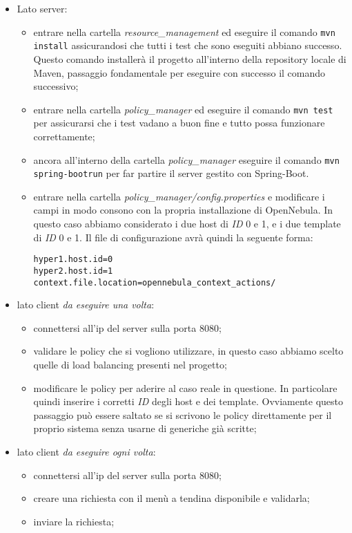 \begin{itemize}
    \item Lato server:
\begin{itemize}
    \item entrare nella cartella \emph{resource\_management} ed eseguire il comando \texttt{mvn install} assicurandosi che tutti i test che sono eseguiti abbiano successo. Questo comando installerà il progetto all'interno della repository locale di Maven, passaggio fondamentale per eseguire con successo il comando successivo;
    \item entrare nella cartella \emph{policy\_manager} ed eseguire il comando \texttt{mvn test} per assicurarsi che i test vadano a buon fine e tutto possa funzionare correttamente;
    \item ancora all'interno della cartella \emph{policy\_manager} eseguire il comando \texttt{mvn spring-boot\:run} per far partire il server gestito con Spring-Boot.
    \item entrare nella cartella \emph{policy\_manager/config.properties} e modificare i campi in modo consono con la propria installazione di OpenNebula. In questo caso abbiamo considerato i due host di \emph{ID} 0 e 1, e i due template di \emph{ID} 0 e 1. Il file di configurazione avrà quindi la seguente forma:
    \begin{lstlisting}[xleftmargin=1em, label={code:config_properties}, caption={config.properties}]
hyper1.host.id=0
hyper2.host.id=1
context.file.location=opennebula_context_actions/
    \end{lstlisting}
\end{itemize}
    \item lato client \emph{da eseguire una volta}:
    \begin{itemize}
        \item connettersi all'ip del server sulla porta 8080;
        \item validare le policy che si vogliono utilizzare, in questo caso abbiamo scelto quelle di load balancing presenti nel progetto;
        \item modificare le policy per aderire al caso reale in questione. In particolare quindi inserire i corretti \emph{ID} degli host e dei template. Ovviamente questo passaggio può essere saltato se si scrivono le policy direttamente per il proprio sistema senza usarne di generiche già scritte;
    \end{itemize}
    \item lato client \emph{da eseguire ogni volta}:
    \begin{itemize}
        \item connettersi all'ip del server sulla porta 8080;
        \item creare una richiesta con il menù a tendina disponibile e validarla;
        \item inviare la richiesta;
    \end{itemize}
\end{itemize}
